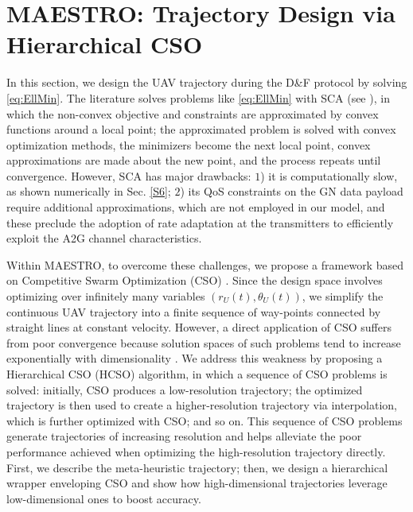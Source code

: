 \documentclass[12pt, draftcls, onecolumn]{IEEEtran}
\theoremstyle{plain}
\theoremstyle{definition}
\theoremstyle{remark}
\begin{document}
\section{MAESTRO: Trajectory Design via Hierarchical CSO}\label{S4}
\vspace{-2mm}

In this section, we design the UAV trajectory during the D\&F protocol by solving \eqref{eq:EllMin}. The literature solves problems like \eqref{eq:EllMin} with SCA (see \cite{SCA, CSCA-ADMM, EnergyEfficientUAVs}), in which the non-convex objective and constraints are approximated by convex functions around a local point; the approximated problem is solved with convex optimization methods, the minimizers become the next local point, convex approximations are made about the new point, and the process repeats until convergence. However, SCA has major drawbacks: $1$) it is computationally slow, as shown numerically in Sec. \ref{S6}; $2$) its QoS constraints on the GN data payload require additional approximations, which are not employed in our model, and these preclude the adoption of rate adaptation at the transmitters to efficiently exploit the A2G channel characteristics.

Within MAESTRO, to overcome these challenges, we propose a framework based on Competitive Swarm Optimization (CSO) \cite{CSO}. Since the design space involves optimizing over infinitely many variables $(r_{U}(t),\theta_{U}(t))$, we simplify the continuous UAV trajectory into a finite sequence of way-points connected by straight lines at constant velocity. However, a direct application of CSO suffers from poor convergence because solution spaces of such problems tend to increase exponentially with dimensionality \cite{HighDimensionality}. We address this weakness by proposing a Hierarchical CSO (HCSO) algorithm, in which a sequence of CSO problems is solved: initially, CSO produces a low-resolution trajectory; the optimized trajectory is then used to create a higher-resolution trajectory via interpolation, which is further optimized with CSO; and so on. This sequence of CSO problems generate trajectories of increasing resolution and helps alleviate the poor performance achieved when optimizing the high-resolution trajectory directly. First, we describe the meta-heuristic trajectory; then, we design a hierarchical wrapper enveloping CSO and show how high-dimensional trajectories leverage low-dimensional ones to boost accuracy.
\end{document}
